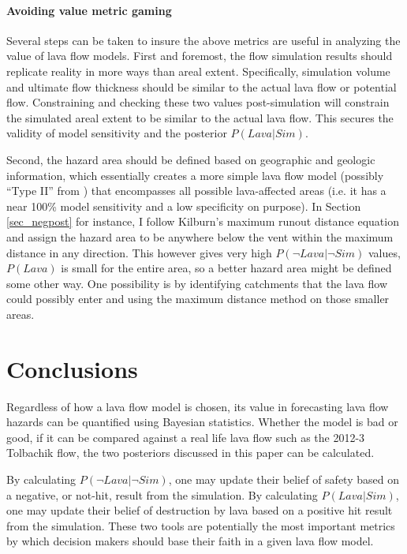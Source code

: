 \documentclass[12pt,letter]{article}
\begin{document}
\paragraph{Avoiding value metric gaming} Several steps can be taken to insure the above metrics are useful in analyzing the value of lava flow models. First and foremost, the flow simulation results should replicate reality in more ways than areal extent. Specifically, simulation volume and ultimate flow thickness should be similar to the actual lava flow or potential flow. Constraining and checking these two values post-simulation will constrain the simulated areal extent to be similar to the actual lava flow. This secures the validity of model sensitivity and the posterior $P(Lava|Sim)$. 

Second, the hazard area should be defined based on geographic and geologic information, which essentially creates a more simple lava flow model (possibly ``Type II'' from \citet{harris2013lava}) that encompasses all possible lava-affected areas (i.e. it has a near 100\% model sensitivity and a low specificity on purpose). In Section \ref{sec_negpost} for instance, I follow Kilburn's maximum runout distance equation and assign the hazard area to be anywhere below the vent within the maximum distance in any direction. This however gives very high $P(\neg Lava|\neg Sim)$ values, $P(Lava)$ is small for the entire area, so a better hazard area might be defined some other way. One possibility is by identifying catchments that the lava flow could possibly enter \citep{kauahikaua1995applications} and using the maximum distance method on those smaller areas.



\section{Conclusions}
Regardless of how a lava flow model is chosen, its value in forecasting lava flow hazards can be quantified using Bayesian statistics. Whether the model is bad or good, if it can be compared against a real life lava flow such as the 2012-3 Tolbachik flow, the two posteriors discussed in this paper can be calculated.

By calculating $P(\neg Lava|\neg Sim)$, one may update their belief of safety based on a negative, or not-hit, result from the simulation. By calculating $P(Lava|Sim)$, one may update their belief of destruction by lava based on a positive hit result from the simulation. These two tools are potentially the most important metrics by which decision makers should base their faith in a given lava flow model.
\end{document}
